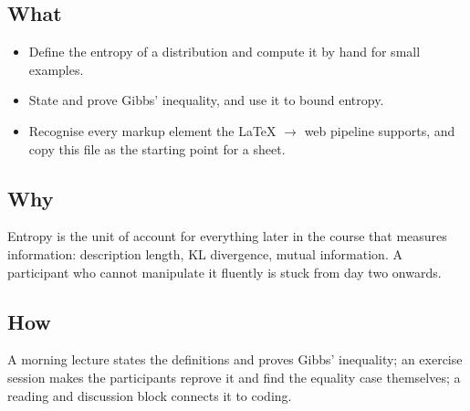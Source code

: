 \documentclass[11pt]{article}
\begin{document}
%
\begin{learningoutcomes}
  \subsection*{What}
  \begin{itemize}
    \item Define the entropy of a distribution and compute it by hand for
          small examples.
    \item State and prove Gibbs' inequality, and use it to bound entropy.
    \item Recognise every markup element the \LaTeX{} $\to$ web pipeline
          supports, and copy this file as the starting point for a sheet.
  \end{itemize}

  \subsection*{Why}
  Entropy is the unit of account for everything later in the course that
  measures information: description length, KL divergence, mutual
  information. A participant who cannot manipulate it fluently is stuck from
  day two onwards.

  \subsection*{How}
  A morning lecture states the definitions and proves Gibbs' inequality; an
  exercise session makes the participants reprove it and find the equality
  case themselves; a reading and discussion block connects it to coding.
\end{learningoutcomes}
\end{document}
